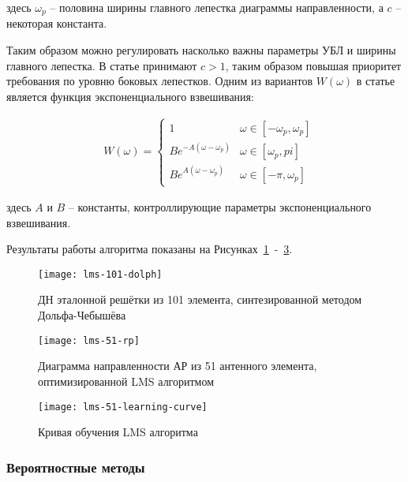 \noindent здесь $\omega_p$ -- половина ширины главного лепестка диаграммы направленности, а $c$ -- некоторая константа.

Таким образом можно регулировать насколько важны параметры УБЛ и ширины главного лепестка. 
В статье принимают $c>1$, таким образом повышая приоритет требования по уровню боковых лепестков. 
Одним из вариантов $W(\omega)$ в статье является функция экспоненциального взвешивания:

\begin{align*}
    & W(\omega) =
    \begin{cases}
        1 & \text{$\omega\in [-\omega_p, \omega_p]$}    \\
        Be^{-A(\omega-\omega_p)} & \text{$\omega \in [\omega_p, pi]$}    \\
        Be^{A(\omega-\omega_p)} & \text{$\omega \in [-\pi, \omega_p]$}
    \end{cases}
\end{align*}

\noindent здесь $A$ и $B$ -- константы, контроллирующие параметры экспоненциального взвешивания.

Результаты работы алгоритма показаны на Рисунках~\ref{fig:lms-101-dolph}~-~\ref{fig:lms-51-learning-curve}.

\begin{figure}[H]
    \centering
    \texttt{[image: lms-101-dolph]}
    \caption{ДН эталонной решётки из 101 элемента, синтезированной методом Дольфа-Чебышёва}%
    \label{fig:lms-101-dolph}
\end{figure}

\begin{figure}[H]
    \centering
    \texttt{[image: lms-51-rp]}
    \caption{Диаграмма направленности АР из 51 антенного элемента, оптимизированной LMS алгоритмом}%
    \label{fig:lms-51-rp}
\end{figure}

\begin{figure}[H]
    \centering
    \texttt{[image: lms-51-learning-curve]}
    \caption{ Кривая обучения LMS алгоритма}%
    \label{fig:lms-51-learning-curve}
\end{figure}




\subsubsection{Вероятностные методы}\label{sec:stochastic-algorithms}

